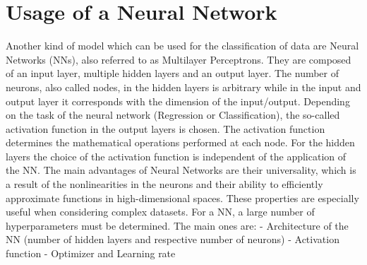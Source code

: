 \documentclass[12pt]{report}
\begin{document}
\section{Usage of a Neural Network}
Another kind of model which can be used for the classification of data are Neural Networks (NNs), also referred to as Multilayer Perceptrons. They are composed of an input layer, multiple hidden layers and an output layer. The number of neurons, also called nodes, in the hidden layers is arbitrary while in the input and output layer it corresponds with the dimension of the input/output. Depending on the task of the neural network (Regression or Classification), the so-called activation function in the output layers is chosen. The activation function determines the mathematical operations performed at each node. For the hidden layers the choice of the activation function is independent of the application of the NN.
The main advantages of Neural Networks are their universality, which is a result of the nonlinearities in the neurons and their ability to efficiently approximate functions in high-dimensional spaces. These properties are especially useful when considering complex datasets.
For a NN, a large number of hyperparameters must be determined. The main ones are:\newline\newline
-	Architecture of the NN (number of hidden layers and respective number of neurons)\newline
-	Activation function\newline
-	Optimizer and Learning rate\newline\newline
\end{document}
